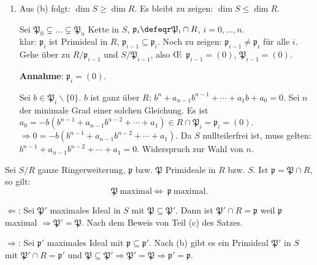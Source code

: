 \begin{Bew}
\begin{enumerate}
\item Aus (b) folgt: $\dim{S} \geq\dim{R}$. Es bleibt zu
zeigen: $\dim{S} \leq \dim{R}$.

Sei $\mathfrak{P}_0\subsetneq \ldots \subsetneq \mathfrak{P}_n$ Kette in $S$, 
$\mathfrak{p}_i\defeqr \mathfrak{P}_i\cap R$, $i=0,\ldots,n$.\\
klar: $\mathfrak{p}_i$ ist Primideal in $R$, $\mathfrak{p}_{i-1}\subseteq \mathfrak{p}_i$.
Noch zu zeigen: $\mathfrak{p}_{i-1}\neq \mathfrak{p}_i$ f\"ur alle $i$. Gehe \"uber zu
$R/\mathfrak{p}_{i-1}$ und $S/\mathfrak{P}_{i-1}$, also \OE\ $\mathfrak{p}_{i-1}=(0)$,
$\mathfrak{P}_{i-1}=(0)$.

\textbf{Annahme}: $\mathfrak{p}_i=(0)$.

Sei $b\in \mathfrak{P}_{i}\backslash \{0\}$. $b$ ist ganz \"uber $R$: $b^n+a_{n-1}b^{n-1}+\cdots+a_1b+a_0=0$. Sei $n$ der minimale Grad einer solchen Gleichung.
Es ist $a_0=-b(b^{n-1}+a_{n-1}b^{n-2}+\cdots+a_1)\in R\cap \mathfrak{P}_i=\mathfrak{p}_i=(0)$.
$\Rightarrow 0=-b(b^{n-1}+a_{n-1}b^{n-2}+\cdots+a_1)$.
Da $S$ nullteilerfrei ist, muss gelten: $b^{n-1}+a_{n-1}b^{n-2}+\cdots+a_1=0$. Widerspruch zur
Wahl von $n$.
\end{enumerate}
\end{Bew}

\begin{Folg}
\label{2.26}
Sei $S/R$ ganze Ringerweiterung, $\mathfrak{p}$ bzw. $\mathfrak{P}$ Primideale in $R$ bzw. $S$.
Ist $\mathfrak{p}=\mathfrak{P}\cap R$, so gilt:
\[
\mathfrak{P}\ \text{maximal} \Leftrightarrow\ \mathfrak{p}\ \text{maximal}.
\]
\end{Folg}

\begin{Bew}
\glqq$\Leftarrow$\grqq: Sei $\mathfrak{P}'$ maximales Ideal in $S$ mit 
$\mathfrak{P}\subseteq \mathfrak P'$. Dann ist $\mathfrak{P}'\cap R=\mathfrak{p}$ weil
$\mathfrak{p}$ maximal $\Rightarrow\mathfrak{P'}=\mathfrak{P}$. Nach dem Beweis
von Teil (c) des Satzes.

\glqq$\Rightarrow$\grqq: Sei $\mathfrak{p}'$ maximales Ideal mit $\mathfrak{p}\subseteq \mathfrak{p'}$.
Nach (b) gibt es ein Primideal $\mathfrak{P}'$ in $S$ mit $\mathfrak{P}'\cap R=\mathfrak{p}'$
und $\mathfrak{P}\subseteq \mathfrak{P}'\Rightarrow \mathfrak{P'}=\mathfrak{P}\Rightarrow
\mathfrak{p}'=\mathfrak{p}$.

\end{Bew}


